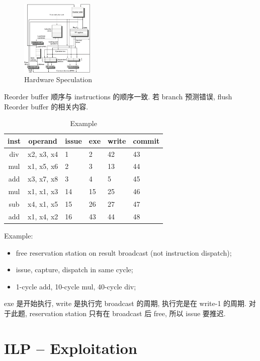 \begin{figure}[!htb]
    \centering
    \includegraphics[width=0.309\textwidth]{pic/CA3/Hardware Speculation}
    \caption{Hardware Speculation}
\end{figure}

Reorder buffer 顺序与 instructions 的顺序一致. 若 branch 预测错误, flush Reorder buffer 的相关内容. 

\begin{table}[!htb]
    \centering
    \caption{Example}
    \begin{tabular}[c]{ccllll}\toprule
        inst & operand & issue & exe & write & commit \\ \midrule
        div & x2, x3, x4 &  1 &  2 & 42 & 43 \\
        mul & x1, x5, x6 &  2 &  3 & 13 & 44 \\
        add & x3, x7, x8 &  3 &  4 &  5 & 45 \\
        mul & x1, x1, x3 & 14 & 15 & 25 & 46 \\
        sub & x4, x1, x5 & 15 & 26 & 27 & 47 \\
        add & x1, x4, x2 & 16 & 43 & 44 & 48 \\
        \bottomrule
    \end{tabular}
\end{table}

Example: 
\begin{itemize}\scriptsize
    \item free reservation station on result broadcast (not instruction dispatch); 
    \item issue, capture, dispatch in same cycle; 
    \item 1-cycle add, 10-cycle mul, 40-cycle div;
\end{itemize}

exe 是开始执行, write 是执行完 broadcast 的周期, 执行完是在 write-1 的周期. 对于此题, reservation station 只有在 broadcast 后 free, 所以 issue 要推迟. 


\newpage
\section{ILP -- Exploitation}
